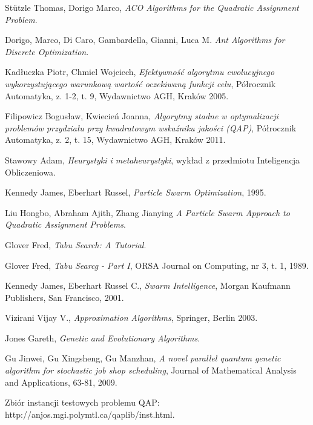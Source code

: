 \begin{thebibliography}{99}
 St\"utzle Thomas, Dorigo Marco, \textit{ACO Algorithms for the Quadratic Assignment Problem}.

 Dorigo, Marco, Di Caro, Gambardella, Gianni, Luca M. \textit{Ant Algorithms for Discrete Optimization}.

 Kadłuczka Piotr, Chmiel Wojciech, \textit{Efektywność algorytmu ewolucyjnego wykorzystującego warunkową wartość oczekiwaną funkcji celu}, Półrocznik Automatyka, z. 1-2, t. 9, Wydawnictwo AGH, Kraków 2005.

 Filipowicz Bogusław, Kwiecień Joanna, \textit{Algorytmy stadne w optymalizacji problemów przydziału przy kwadratowym wskaźniku jakości (QAP)}, Półrocznik Automatyka, z. 2, t. 15, Wydawnictwo AGH, Kraków 2011.

 Stawowy Adam, \textit{Heurystyki i metaheurystyki}, wykład z przedmiotu Inteligencja Obliczeniowa.

 Kennedy James, Eberhart Russel, \textit{Particle Swarm Optimization}, 1995.

 Liu Hongbo, Abraham Ajith, Zhang Jianying \textit{A Particle Swarm Approach to Quadratic Assignment Problems}.

 Glover Fred, \textit{Tabu Search: A Tutorial}.

 Glover Fred, \textit{Tabu Searcg - Part I}, ORSA Journal on Computing, nr 3, t. 1, 1989.

 Kennedy James, Eberhart Russel C., \textit{Swarm Intelligence}, Morgan Kaufmann Publishers, San Francisco, 2001.

 Vizirani Vijay V., \textit{Approximation Algorithms}, Springer, Berlin 2003.

 Jones Gareth, \textit{Genetic and Evolutionary Algorithms}.

 Gu Jinwei, Gu Xingsheng, Gu Manzhan, \textit{A novel parallel quantum genetic algorithm for stochastic job shop scheduling}, Journal of Mathematical Analysis and Applications, 63-81, 2009.

 Zbiór instancji testowych problemu QAP: http://anjos.mgi.polymtl.ca/qaplib/inst.html.

\end{thebibliography}